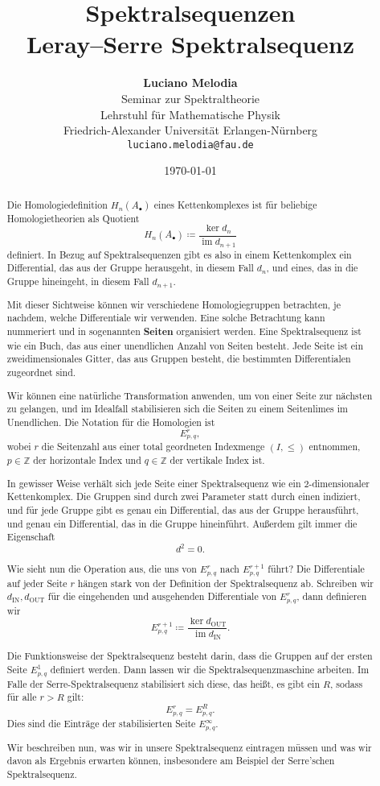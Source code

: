 \documentclass[12pt]{article}
\title{\textbf{Spektralsequenzen\\ Leray–Serre Spektralsequenz}}
\author{
\textbf{Luciano Melodia} \\
Seminar zur Spektraltheorie \\
Lehrstuhl für Mathematische Physik \\
Friedrich-Alexander Universität Erlangen-Nürnberg \\
\texttt{luciano.melodia@fau.de}}
\date{\today}
\numberwithin{conj}{section}
\begin{document}
\hypersetup{bookmarksnumbered=true,}
\maketitle

\begin{abstract}
Die Homologiedefinition $H_n(A_\bullet)$ eines Kettenkomplexes ist für beliebige Homologietheorien als Quotient 
\[
H_n(A_\bullet) \coloneq \frac{\ker d_n}{\operatorname{im} d_{n+1}}
\] 
definiert. In Bezug auf Spektralsequenzen gibt es also in einem Kettenkomplex ein Differential, das aus der Gruppe herausgeht, in diesem Fall $d_n$, und eines, das in die Gruppe hineingeht, in diesem Fall $d_{n+1}$.

Mit dieser Sichtweise können wir verschiedene Homologiegruppen betrachten, je nachdem, welche Differentiale wir verwenden. Eine solche Betrachtung kann nummeriert und in sogenannten \textbf{Seiten} organisiert werden. Eine Spektralsequenz ist wie ein Buch, das aus einer unendlichen Anzahl von Seiten besteht. Jede Seite ist ein zweidimensionales Gitter, das aus Gruppen besteht, die bestimmten Differentialen zugeordnet sind.

Wir können eine natürliche Transformation anwenden, um von einer Seite zur nächsten zu gelangen, und im Idealfall stabilisieren sich die Seiten zu einem Seitenlimes im Unendlichen. Die Notation für die Homologien ist 
\[
E^r_{p,q},
\]
wobei $r$ die Seitenzahl aus einer total geordneten Indexmenge $(I,\leq)$ entnommen, $p \in \mathbb{Z}$ der horizontale Index und $q \in \mathbb{Z}$ der vertikale Index ist.

In gewisser Weise verhält sich jede Seite einer Spektralsequenz wie ein $2$-dimensionaler Kettenkomplex. Die Gruppen sind durch zwei Parameter statt durch einen indiziert, und für jede Gruppe gibt es genau ein Differential, das aus der Gruppe herausführt, und genau ein Differential, das in die Gruppe hineinführt. Außerdem gilt immer die Eigenschaft 
\[
d^2 = 0.
\]

Wie sieht nun die Operation aus, die uns von $E^r_{p,q}$ nach $E^{r+1}_{p,q}$ führt? Die Differentiale auf jeder Seite $r$ hängen stark von der Definition der Spektralsequenz ab. Schreiben wir $d_{\operatorname{IN}}, d_{\operatorname{OUT}}$ für die eingehenden und ausgehenden Differentiale von $E^r_{p,q}$, dann definieren wir
\[
E^{r+1}_{p,q} \coloneq \frac{\ker d_{\operatorname{OUT}}}{\operatorname{im} d_{\operatorname{IN}}}.
\]

Die Funktionsweise der Spektralsequenz besteht darin, dass die Gruppen auf der ersten Seite $E^1_{p,q}$ definiert werden. Dann lassen wir die Spektralsequenzmaschine arbeiten. Im Falle der Serre-Spektralsequenz stabilisiert sich diese, das heißt, es gibt ein $R$, sodass für alle $r > R$ gilt:
\[
E^r_{p,q} = E^R_{p,q}.
\]
Dies sind die Einträge der stabilisierten Seite $E^\infty_{p,q}$.

Wir beschreiben nun, was wir in unsere Spektralsequenz eintragen müssen und was wir davon als Ergebnis erwarten können, insbesondere am Beispiel der Serre’schen Spektralsequenz.
\end{abstract}
\end{document}
